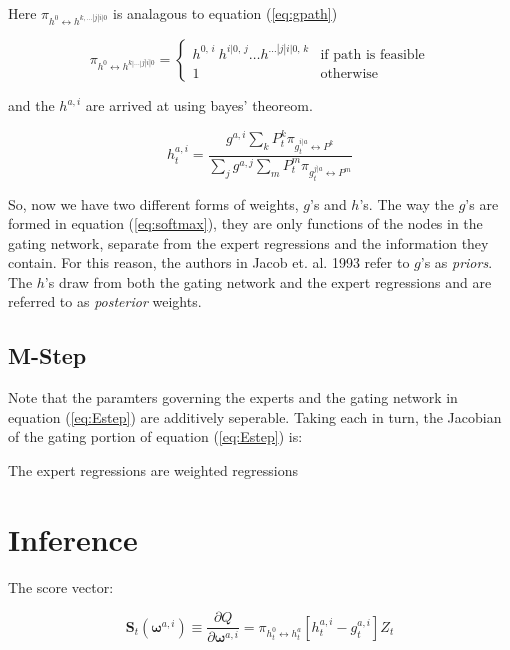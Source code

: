 \documentclass[12pt]{article}
\newcommand{\gateprod}[2]{\pi_{#1 \longleftrightarrow #2}}
\newcommand{\shortsum}[1]{\sum \nolimits_{#1}}
\newcommand{\h}[2]{h^{#1}_{#2}}
\begin{document}
Here $\gateprod{h^{0}}{h^{k,\dots|j|i|0}}$ is analagous to equation (\ref{eq:gpath})

\begin{equation} \label{eq:hpath}
  \gateprod{h^{0}}{h^{k|\ldots|j|i|0}} =
    \begin{cases} 
       h^{0, \, i} \ h^{i|0, \, j} \ldots h^{\dots|j|i|0, \, k} & \textrm{if path is feasible} \\
       1 & \textrm{otherwise}
    \end{cases}
\end{equation}

and the $h^{a, i}$ are arrived at using bayes' theoreom.

\begin{equation} \label{eq:posteriornode}
  \h{a,i}{t} = \frac{g^{a, i} \shortsum{k} P^{k}_{t} \gateprod{g^{i|a}_{t}}{P^{k}}}{\shortsum{j} g^{a, j} \shortsum{m} P^{m}_{t} \gateprod{g^{j|a}_{t}}{P^{m}}}
\end{equation}


So, now we have two different forms of weights, $g$'s and $h$'s. The
way the $g$'s are formed in equation (\ref{eq:softmax}), they are only
functions of the nodes in the gating network, separate from the
expert regressions and the information they contain. For this reason,
the authors in Jacob et. al. 1993 refer to $g$'s as \textit{priors}.
The $h$'s draw from both the gating network and the expert regressions and
are referred to as \textit{posterior} weights.


\subsection{M-Step}

Note that the paramters governing the experts and the gating network in
equation (\ref{eq:Estep}) are additively seperable. Taking each in turn, the
Jacobian of the gating portion of equation (\ref{eq:Estep}) is:

The expert regressions are weighted regressions 







\section{Inference} \label{sec:Inference}

The score vector:

\begin{equation} \label{eq:gateScore}
  \boldsymbol{S}_{t}(\boldsymbol{\omega}^{a, i}) \equiv \frac{\partial Q}{\partial \boldsymbol{\omega}^{a,i}} = \gateprod{h^{0}_{t}}{h^{a}_{t}} \left[h^{a, i}_{t} - g^{a, i}_{t} \right] Z_{t}
\end{equation}
\end{document}
